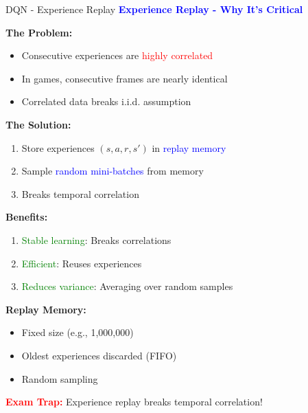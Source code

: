 \documentclass[8pt]{beamer}
\begin{document}
	\begin{frame}{DQN - Experience Replay}
		\fontsize{6.5}{7.5}\selectfont
		\textcolor{blue}{\textbf{Experience Replay - Why It's Critical}}
		
		\textbf{The Problem:}
		\begin{itemize}
			\item Consecutive experiences are \textcolor{red}{highly correlated}
			\item In games, consecutive frames are nearly identical
			\item Correlated data breaks i.i.d. assumption
		\end{itemize}
		
		\textbf{The Solution:}
		\begin{enumerate}
			\item Store experiences $(s,a,r,s')$ in \textcolor{blue}{replay memory}
			\item Sample \textcolor{blue}{random mini-batches} from memory
			\item Breaks temporal correlation
		\end{enumerate}
		
		\textbf{Benefits:}
		\begin{enumerate}
			\item \textcolor{green}{Stable learning}: Breaks correlations
			\item \textcolor{green}{Efficient}: Reuses experiences
			\item \textcolor{green}{Reduces variance}: Averaging over random samples
		\end{enumerate}
		
		\textbf{Replay Memory:}
		\begin{itemize}
			\item Fixed size (e.g., 1,000,000)
			\item Oldest experiences discarded (FIFO)
			\item Random sampling
		\end{itemize}
		
		\textcolor{red}{\textbf{Exam Trap:}} Experience replay breaks temporal correlation!
	\end{frame}
	
\end{document}
